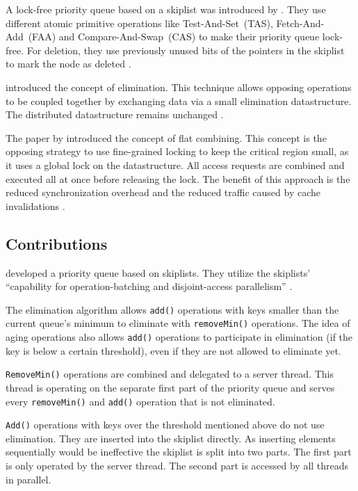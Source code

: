 A lock-free priority queue based on a skiplist was introduced by \citeauthor{sundell_fast_2003}. They use different atomic primitive operations like Test-And-Set~(TAS), Fetch-And-Add~(FAA) and Compare-And-Swap~(CAS) to make their priority queue lock-free. For deletion, they use previously unused bits of the pointers in the skiplist to mark the node as deleted \cite{sundell_fast_2003}.

\citeauthor{shavit_elimination_1997} introduced the concept of elimination. This technique allows opposing operations to be coupled together by exchanging data via a small elimination datastructure. The distributed datastructure remains unchanged \cite{shavit_elimination_1997}.

The paper by \citeauthor{hendler_flat_2010} introduced the concept of flat combining. This concept is the opposing strategy to use fine-grained locking to keep the critical region small, as it uses a global lock on the datastructure. All access requests are combined and executed all at once before releasing the lock. The benefit of this approach is the reduced synchronization overhead and the reduced traffic caused by cache invalidations \cite{hendler_flat_2010}.

\subsection{Contributions}

\citeauthor{calciu_adaptive_2014} developed a priority queue based on skiplists. They utilize the skiplists' \enquote{capability for operation-batching and disjoint-access parallelism} \cite[407]{calciu_adaptive_2014}.

The elimination algorithm allows \texttt{add()} operations with keys smaller than the current queue's minimum to eliminate with \texttt{removeMin()} operations. The idea of aging operations also allows \texttt{add()} operations to participate in elimination (if the key is below a certain threshold), even if they are not allowed to eliminate yet.

\texttt{RemoveMin()} operations are combined and delegated to a server thread. This thread is operating on the separate first part of the priority queue and serves every \texttt{removeMin()} and \texttt{add()} operation that is not eliminated.

\texttt{Add()} operations with keys over the threshold mentioned above do not use elimination. They are inserted into the skiplist directly. As inserting elements sequentially would be ineffective the skiplist is split into two parts. The first part is only operated by the server thread. The second part is accessed by all threads in parallel.

